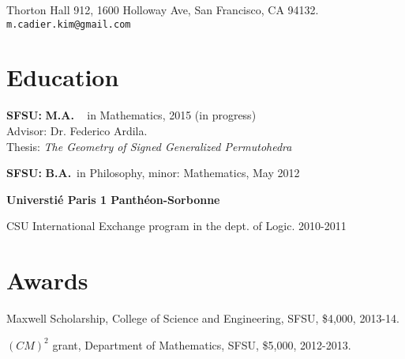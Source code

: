 \documentclass[margin,line,pifont,palatino,courier]{res}
\newenvironment{list1}{
  \begin{list}{\label{}}{%
      \setlength{\itemsep}{0in}
      \setlength{\parsep}{0in} \setlength{\parskip}{0in}
      \setlength{\topsep}{0in} \setlength{\partopsep}{0in}
      \setlength{\leftmargin}{0.0in}}}{\end{list}}
\begin{document}


\begin{resume}
\begin{flushright}
{\small
Thorton Hall 912, 1600 Holloway Ave, San Francisco, CA 94132. \\
  \verb+m.cadier.kim@gmail.com+
}
\end{flushright}
 



 \section{\sc Education} 
\begin{list1}
\item  {\bf SFSU:}  \textbf{M.A.} ~ in Mathematics, 2015 (in progress) \\
Advisor: Dr. Federico Ardila. \\
 Thesis: {\em The Geometry of Signed Generalized Permutohedra} 


\item  {\bf SFSU:}  \textbf{B.A.}~in Philosophy, minor:    
Mathematics, May 2012 

\item {\bf Universti\'e Paris 1 Panth\'{e}on-Sorbonne}

CSU International Exchange program in the dept. of Logic. 2010-2011\\

%

\end{list1}





 \section{\sc Awards}
\begin{list1}
  \item  Maxwell Scholarship, College of Science and Engineering, SFSU, \$4,000,  2013-14.
  \item $(CM)^2$ grant, Department of Mathematics, SFSU, \$5,000, 2012-2013.
\end{list1}







\end{resume}
\end{document}
